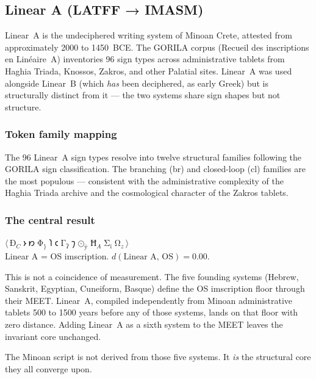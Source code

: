 \documentclass[12pt,a4paper]{article}
\begin{document}
\subsection{Linear A (LATFF → IMASM)}

Linear~A is the undeciphered writing system of Minoan Crete, attested from approximately 2000 to 1450~BCE. The GORILA corpus (Recueil des inscriptions en Linéaire~A) inventories 96 sign types across administrative tablets from Haghia Triada, Knossos, Zakros, and other Palatial sites. Linear~A was used alongside Linear~B (which \emph{has} been deciphered, as early Greek) but is structurally distinct from it --- the two systems share sign shapes but not structure.

\subsubsection{Token family mapping}

The 96 Linear~A sign types resolve into twelve structural families following the GORILA sign classification. The branching (br) and closed-loop (cl) families are the most populous --- consistent with the administrative complexity of the Haghia Triada archive and the cosmological character of the Zakros tablets.

\subsubsection{The central result}

\begin{imscriptionbox}
$\langle\,\text{Ð}_C\;𐑶\;𐑽\;\text{Φ}_{\}}\;𐑐\;𐑤\;\text{Γ}_\text{ʔ}\;𐑠\;\text{⊙}_\text{ÿ}\;\text{Ħ}_A\;\text{Σ}_\text{ï}\;\text{Ω}_z\,\rangle$\\[4pt]
{\normalsize Linear A = OS imscription. $d(\text{Linear A},\, \text{OS}) = 0.00$.}
\end{imscriptionbox}

This is not a coincidence of measurement. The five founding systems (Hebrew, Sanskrit, Egyptian, Cuneiform, Basque) define the OS imscription floor through their MEET. Linear~A, compiled independently from Minoan administrative tablets 500 to 1500 years before any of those systems, lands on that floor with zero distance. Adding Linear~A as a sixth system to the MEET leaves the invariant core unchanged.

The Minoan script is not derived from those five systems. It \emph{is} the structural core they all converge upon.
\end{document}
